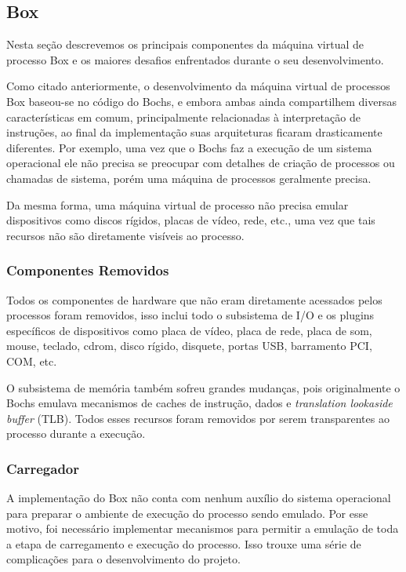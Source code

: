 \documentclass[11pt,twoside]{article}
\begin{document}
\subsection{Box}

Nesta seção descrevemos os principais componentes da máquina virtual de processo
Box e os maiores desafios enfrentados durante o seu desenvolvimento.

Como citado anteriormente, o desenvolvimento da máquina virtual de processos Box
baseou-se no código do Bochs, e embora ambas ainda compartilhem diversas
características em comum, principalmente relacionadas à interpretação de
instruções, ao final da implementação suas arquiteturas ficaram drasticamente
diferentes. Por exemplo, uma vez que o Bochs faz a execução de um sistema
operacional ele não precisa se preocupar com detalhes de criação de processos ou
chamadas de sistema, porém uma máquina de processos geralmente precisa. 

Da mesma forma, uma máquina virtual de processo não precisa emular dispositivos
como discos rígidos, placas de vídeo, rede, etc., uma vez que tais recursos não
são diretamente visíveis ao processo.

\subsubsection{Componentes Removidos}

Todos os componentes de hardware que não eram diretamente acessados pelos
processos foram removidos, isso inclui todo o subsistema de I/O e os
plugins específicos de dispositivos como placa de vídeo, placa de rede, placa de
som, mouse, teclado, cdrom, disco rígido, disquete, portas USB, barramento PCI,
COM, etc.

O subsistema de memória também sofreu grandes mudanças, pois originalmente o
Bochs emulava mecanismos de caches de instrução, dados e \emph{translation
lookaside buffer} (TLB). Todos esses recursos foram removidos por serem
transparentes ao processo durante a execução.

\subsubsection{Carregador}

A implementação do Box não conta com nenhum auxílio do sistema operacional para
preparar o ambiente de execução do processo sendo emulado. Por esse motivo, foi
necessário implementar mecanismos para permitir a emulação de toda a etapa de
carregamento e execução do processo. Isso trouxe uma série de complicações para
o desenvolvimento do projeto.
\end{document}
